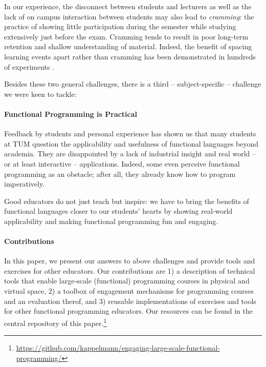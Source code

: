 In our experience, the disconnect between students and lecturers as well as the lack of on campus interaction between students may also lead to \emph{cramming}:
the practice of showing little participation during the semester
while studying extensively just before the exam.
Cramming tends to result in poor long-term retention and shallow understanding of material.
Indeed, the benefit of spacing learning events apart rather than cramming has been demonstrated in hundreds of experiments \cite{cramming1,cramming2}.

\vspace{\baselineskip}\noindent
Besides these two general challenges,
there is a third -- subject-specific --
challenge we were keen to tackle:

\paragraph{Functional Programming is Practical}
Feedback by students and personal experience has shown us that many students
at TUM question the applicability and usefulness
of functional languages beyond academia.
They are disappointed by a lack of industrial insight
and real world -- or at least interactive -- applications.
Indeed, some even perceive functional programming as an obstacle;
after all, they already know how to program imperatively.

Good educators do not just teach but inspire:
we have to bring the benefits of functional languages
closer to our students' hearts
by showing real-world applicability and making functional programming fun and engaging.

\paragraph{Contributions}
In this paper,
we present our answers to above challenges
and provide tools and exercises for other educators.
Our contributions are
1) a description of technical tools that enable large-scale (functional) programming courses in physical and virtual space,
2) a toolbox of engagement mechanisms
for programming courses
and an evaluation therof, and
3) reusable implementations of exercises and tools for other functional programming educators.
Our resources can be found in the central repository of this paper.\footnote{\url{https://github.com/kappelmann/engaging-large-scale-functional-programming/}}


